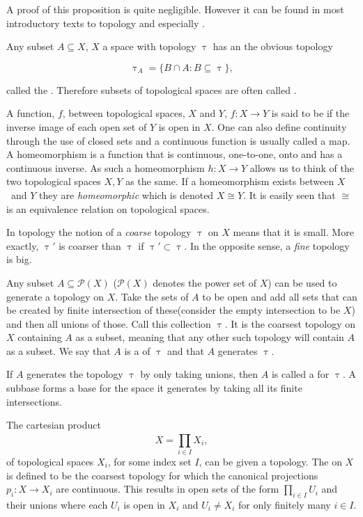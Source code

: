 \documentclass[../../main.tex]{subfiles}
\begin{document}
    A proof of this proposition is quite negligible. However it can be found in most introductory texts to topology and especially \cite{armstrong-basictop}.

    Any subset $A \subseteq X$, $X$ a space with topology $\uptau$ has an the obvious topology 

    \begin{equation*}
        \uptau_A = \{B \cap A: B \subseteq \uptau\},
    \end{equation*}

    called the . Therefore subsets of topological spaces are often called .
    
    A function, $f$, between topological spaces, $X$ and $Y$, $f:X\to Y$ is said to be  if the inverse image of each open set of $Y$ is open in $X$. One can also define continuity through the use of closed sets and a continuous function is usually called a map. A homeomorphism is a function that is continuous, one-to-one, onto and has a continuous inverse. As such a homeomorphism $h:X\to Y$ allows us to think of the two topological spaces $X, Y$ as the same. If a homeomorphism exists between $X$ and $Y$ they are \emph{homeomorphic} which is denoted $X \cong Y$. It is easily seen that $\cong$ is an equivalence relation on topological spaces.

    In topology the notion of a \textit{coarse} topology $\uptau$ on $X$ means that it is small. More exactly, $\uptau'$ is coarser than $\uptau$ if $\uptau' \subset \uptau$. In the opposite sense, a \textit{fine} topology is big.
    
    Any subset $A \subseteq \mathcal{P}(X)$ ($\mathcal{P}(X)$ denotes the power set of $X$) can be used to generate a topology on $X$. Take the sets of $A$ to be open and add all sets that can be created by finite intersection of these(consider the empty intersection to be $X$) and then all unions of those. Call this collection $\uptau$. It is the coarsest topology on $X$ containing $A$ as a subset, meaning that any other such topology will contain $A$ as a subset. We say that $A$ is a  of $\uptau$ and that $A$ generates $\uptau$.
    
    If $A$ generates the topology $\uptau$ by only taking unions, then $A$ is called a  for $\uptau$. A subbase forms a base for the space it generates by taking all its finite intersections.
    
    \begin{definition}\label{top-prod}
        The cartesian product \[X=\prod_{i\in I}^{}X_i,\] of topological spaces $X_i$, for some index set $I$, can be given a topology. The  on $X$ is defined to be the coarsest topology for which the canonical projections $p_i:X\to X_i$ are continuous. This results in open sets of the form $ \prod_{i\in I}U_i$ and their unions where each $U_i$ is open in $X_i$ and $U_i \ne X_i$ for only finitely many $i\in I$.
    \end{definition}
\end{document}
